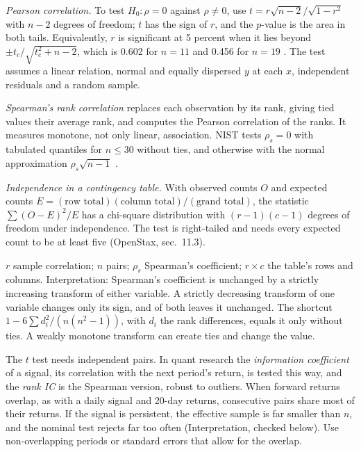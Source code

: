 \begin{qfmethod}\label{meth:correlation-independence-tests}
 \emph{Pearson correlation.} To test $H_0:\rho=0$ against $\rho\ne0$, use $t=r\sqrt{n-2}/\sqrt{1-r^2}$ with $n-2$ degrees of freedom; $t$ has the sign of $r$, and the $p$-value is the area in both tails. Equivalently, $r$ is significant at 5 percent when it lies beyond $\pm t_c/\sqrt{t_c^2+n-2}$, which is 0.602 for $n=11$ and 0.456 for $n=19$ \citep[sec.~12.4]{introductory-statistics-2023}. The test assumes a linear relation, normal and equally dispersed $y$ at each $x$, independent residuals and a random sample.

\emph{Spearman's rank correlation} replaces each observation by its rank, giving tied values their average rank, and computes the Pearson correlation of the ranks. It measures monotone, not only linear, association. NIST tests $\rho_s=0$ with tabulated quantiles for $n\le30$ without ties, and otherwise with the normal approximation $\rho_s\sqrt{n-1}$ \citep[``Rank Correlation Independence Test'']{nist-dataplot-rank-correlation}.

\emph{Independence in a contingency table.} With observed counts $O$ and expected counts $E=(\text{row total})(\text{column total})/(\text{grand total})$, the statistic $\sum(O-E)^2/E$ has a chi-square distribution with $(r-1)(c-1)$ degrees of freedom under independence. The test is right-tailed and needs every expected count to be at least five (OpenStax, sec.~11.3).

 $r$ sample correlation; $n$ pairs; $\rho_s$ Spearman's coefficient; $r\times c$ the table's rows and columns. Interpretation: Spearman's coefficient is unchanged by a strictly increasing transform of either variable. A strictly decreasing transform of one variable changes only its sign, and of both leaves it unchanged. The shortcut $1-6\sum d_i^2/(n(n^2-1))$, with $d_i$ the rank differences, equals it only without ties. A weakly monotone transform can create ties and change the value.

 The $t$ test needs independent pairs. In quant research the \emph{information coefficient} of a signal, its correlation with the next period's return, is tested this way, and the \emph{rank IC} is the Spearman version, robust to outliers. When forward returns overlap, as with a daily signal and 20-day returns, consecutive pairs share most of their returns. If the signal is persistent, the effective sample is far smaller than $n$, and the nominal test rejects far too often (Interpretation, checked below). Use non-overlapping periods or standard errors that allow for the overlap.


\end{qfmethod}
